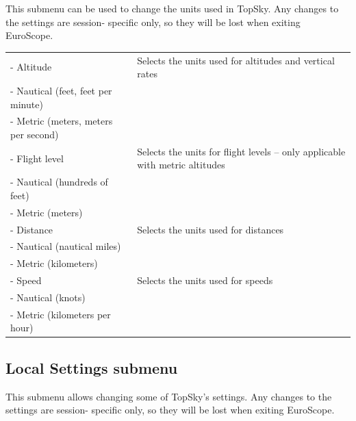 \documentclass[11pt,a4paper,oldfontcommands]{memoir}
\begin{document}
This submenu can be used to change the units used in TopSky. Any changes to the settings are session- specific only, so they will be lost when exiting EuroScope.

\begin{tabular}{l l}
    - Altitude & Selects the units used for altitudes and vertical rates\\
    - Nautical (feet, feet per minute)\\
    - Metric (meters, meters per second)\\
    - Flight level & Selects the units for flight levels – only applicable with metric altitudes\\
    - Nautical (hundreds of feet)\\
    - Metric (meters)\\
    - Distance & Selects the units used for distances\\
    - Nautical (nautical miles)\\
    - Metric (kilometers)\\
    - Speed & Selects the units used for speeds\\
    - Nautical (knots)\\
    - Metric (kilometers per hour)\\
\end{tabular}

\subsection*{Local Settings submenu}
\label{menu:localset}

This submenu allows changing some of TopSky’s settings. Any changes to the settings are session-
specific only, so they will be lost when exiting EuroScope.
\medskip
\end{document}
